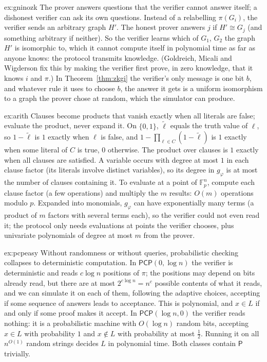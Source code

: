 \begin{solution}{ex:gninozk}
\idea The prover answers questions that the verifier cannot answer itself; a dishonest verifier can ask its own questions.
\writeup Instead of a relabelling $\pi(G_i)$, the verifier sends an arbitrary graph $H'$. The honest prover answers $j$ if $H'\cong G_j$ (and something arbitrary if neither). So the verifier learns which of $G_1$, $G_2$ the graph $H'$ is isomorphic to, which it cannot compute itself in polynomial time as far as anyone knows: the protocol transmits knowledge. (Goldreich, Micali and Wigderson fix this by making the verifier first prove, in zero knowledge, that it knows $i$ and $\pi$.) In Theorem~\ref{thm:zkgi} the verifier's only message is one bit $b$, and whatever rule it uses to choose $b$, the answer it gets is a uniform isomorphism to a graph the prover chose at random, which the simulator can produce.
\end{solution}

\begin{solution}{ex:arith}
\idea Clauses become products that vanish exactly when all literals are false; evaluate the product, never expand it.
\writeup On $\{0,1\}$, $\tilde\ell$ equals the truth value of $\ell$, so $1-\tilde\ell$ is $1$ exactly when $\ell$ is false, and $1-\prod_{\ell\in C}(1-\tilde\ell)$ is $1$ exactly when some literal of $C$ is true, $0$ otherwise. The product over clauses is $1$ exactly when all clauses are satisfied. A variable occurs with degree at most $1$ in each clause factor (its literals involve distinct variables), so its degree in $g_\varphi$ is at most the number of clauses containing it. To evaluate at a point of $\mathbb F_p^n$, compute each clause factor (a few operations) and multiply the $m$ results: $O(m)$ operations modulo $p$. Expanded into monomials, $g_\varphi$ can have exponentially many terms (a product of $m$ factors with several terms each), so the verifier could not even read it; the protocol only needs evaluations at points the verifier chooses, plus univariate polynomials of degree at most $m$ from the prover.
\end{solution}

\begin{solution}{ex:pcpeasy}
\idea Without randomness or without queries, probabilistic checking collapses to deterministic computation.
\writeup In $\mathsf{PCP}(0,\log n)$ the verifier is deterministic and reads $c\log n$ positions of $\pi$; the positions may depend on bits already read, but there are at most $2^{c\log n}=n^c$ possible contents of what it reads, and we can simulate it on each of them, following the adaptive choices, accepting if some sequence of answers leads to acceptance. This is polynomial, and $x\in L$ if and only if some proof makes it accept. In $\mathsf{PCP}(\log n,0)$ the verifier reads nothing: it is a probabilistic machine with $O(\log n)$ random bits, accepting $x\in L$ with probability $1$ and $x\notin L$ with probability at most $\frac12$. Running it on all $n^{O(1)}$ random strings decides $L$ in polynomial time. Both classes contain $\mathsf P$ trivially.
\end{solution}

